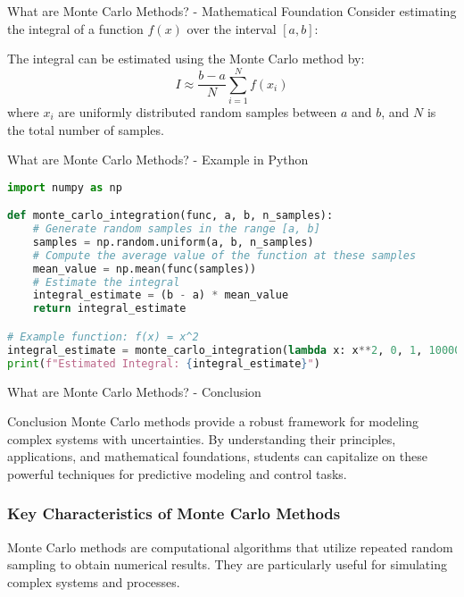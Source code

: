 \documentclass[aspectratio=169]{beamer}
\begin{document}
\begin{frame}[fragile]{What are Monte Carlo Methods? - Mathematical Foundation}
    Consider estimating the integral of a function \( f(x) \) over the interval \([a, b]\):
    
    The integral can be estimated using the Monte Carlo method by:
    \begin{equation}
        I \approx \frac{b-a}{N} \sum_{i=1}^{N} f(x_i)
    \end{equation}
    where \( x_i \) are uniformly distributed random samples between \( a \) and \( b \), and \( N \) is the total number of samples.
\end{frame}

\begin{frame}[fragile]{What are Monte Carlo Methods? - Example in Python}
    \begin{lstlisting}[language=Python]
import numpy as np

def monte_carlo_integration(func, a, b, n_samples):
    # Generate random samples in the range [a, b]
    samples = np.random.uniform(a, b, n_samples)
    # Compute the average value of the function at these samples
    mean_value = np.mean(func(samples))
    # Estimate the integral
    integral_estimate = (b - a) * mean_value
    return integral_estimate

# Example function: f(x) = x^2
integral_estimate = monte_carlo_integration(lambda x: x**2, 0, 1, 10000)
print(f"Estimated Integral: {integral_estimate}")
    \end{lstlisting}
\end{frame}

\begin{frame}[fragile]{What are Monte Carlo Methods? - Conclusion}
    \begin{block}{Conclusion}
        Monte Carlo methods provide a robust framework for modeling complex systems with uncertainties. By understanding their principles, applications, and mathematical foundations, students can capitalize on these powerful techniques for predictive modeling and control tasks.
    \end{block}
\end{frame}

\begin{frame}[fragile]
    \frametitle{Key Characteristics of Monte Carlo Methods}
    Monte Carlo methods are computational algorithms that utilize repeated random sampling to obtain numerical results. They are particularly useful for simulating complex systems and processes.
\end{frame}
\end{document}
